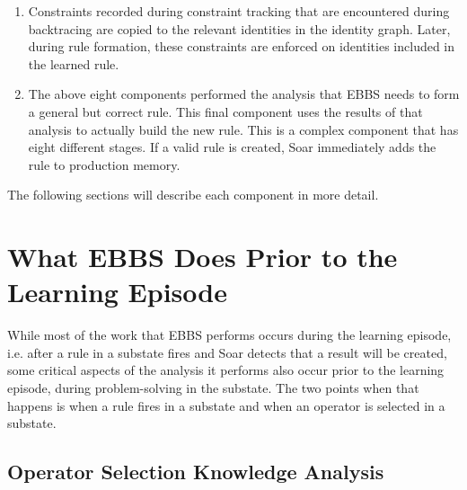 \begin{enumerate}
	\item {} \newline
	Constraints recorded during constraint tracking that are encountered during backtracing are copied to the relevant identities in the identity graph. Later, during rule formation, these constraints are enforced on identities included in the learned rule.
	
	\item {} \newline
	The above eight components performed the analysis that EBBS needs to form a general but correct rule.  This final component uses the results of that analysis to actually build the new rule.  This is a complex component that has eight different stages.  If a valid rule is created, Soar immediately adds the rule to production memory.
\end{enumerate}


The following sections will describe each component in more detail.


\section{What EBBS Does Prior to the Learning Episode}
\label{CHUNKING-prior}

While most of the work that EBBS performs occurs during the learning episode, i.e. after a rule in a substate fires and Soar detects that a result will be created, some critical aspects of the analysis it performs also occur prior to the learning episode, during problem-solving in the substate.  The two points when that happens is when a rule fires in a substate and when an operator is selected in a substate.


\subsection{Operator Selection Knowledge Analysis}
\label{CHUNKING-prior-osk}

